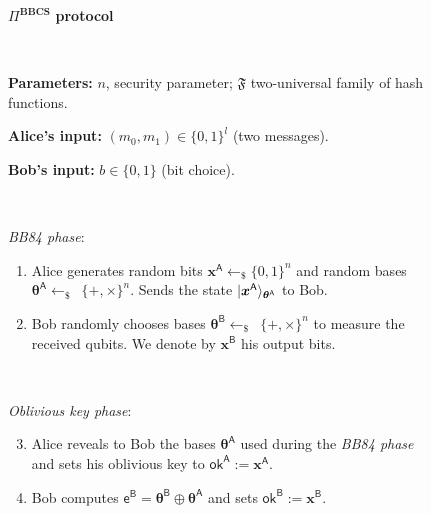 \begin{figure}[h!]
    \centering
        \begin{tcolorbox}
            
            \centerline{$\Pi^{\textbf{BBCS}}$ \textbf{protocol}}
            
            \
            
            \textbf{Parameters:} $n$, security parameter; $\mathfrak{F}$ two-universal family of hash functions.
            
            \textbf{Alice's input:} $(m_0, m_1)\in\{0,1\}^l$ (two messages). 
            
            \textbf{Bob's input:} $b\in\{0,1\}$ (bit choice).
            
            \
            
            \textit{BB84 phase}:
            \begin{enumerate}
                \item Alice generates random bits $\bm{x}^{\mathsf{A}}\leftarrow_{\$}\{0,1\}^n$ and random bases $\bm{\theta}^{\mathsf{A}}\leftarrow_{\$}$~$\{+,\times\}^n$. Sends the state $| \bm{x}^{\mathsf{A}} \rangle_{\bm{\theta}^{\mathsf{A}}}$ to Bob.
                \item Bob randomly chooses bases $\bm{\theta}^{\mathsf{B}}\leftarrow_{\$}$~$\{+,\times\}^n$ to measure the received qubits. We denote by $\bm{x}^{\mathsf{B}}$ his output bits.
            \end{enumerate}
            
            \
            
            \textit{Oblivious key phase}:
            \begin{enumerate}
            \setcounter{enumi}{2}
                \item Alice reveals to Bob the bases $\bm{\theta}^{\mathsf{A}}$ used during the \textit{BB84 phase} and sets his oblivious key to $\mathsf{ok}^{\mathsf{A}}:=\bm{x}^{\mathsf{A}}$.
                \item Bob computes $\mathsf{e}^\mathsf{B} = \bm{\theta}^{\mathsf{B}} \oplus \bm{\theta}^{\mathsf{A}}$ and sets $\mathsf{ok}^{\mathsf{B}}:=\bm{x}^{\mathsf{B}}$.
            \end{enumerate}
            
            \
            

\end{tcolorbox}
\end{figure}
